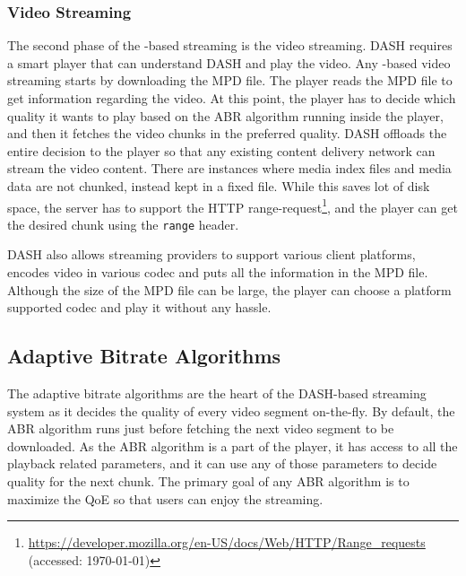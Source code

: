 \subsubsection{Video Streaming}
The second phase of the -based streaming is the video streaming. \ac{DASH} requires a smart player that can understand \ac{DASH} and play the video. Any -based video streaming starts by downloading the \ac{MPD} file. The player reads the \ac{MPD} file to get information regarding the video.  At this point, the player has to decide which quality it wants to play based on the \ac{ABR} algorithm running inside the player, and then it fetches the video chunks in the preferred quality. \ac{DASH} offloads the entire decision to the player so that any existing content delivery network can stream the video content. There are instances where media index files and media data are not chunked, instead kept in a fixed file. While this saves lot of disk space, the server has to support the HTTP range-request\footnote{\url{https://developer.mozilla.org/en-US/docs/Web/HTTP/Range_requests} (accessed: \today)}, and the player can get the desired chunk using the {\tt range} header.

\ac{DASH} also allows streaming providers to support various client platforms, encodes video in various codec and puts all the information in the \ac{MPD} file. Although the size of the \ac{MPD} file can be large, the player can choose a platform supported codec and play it without any hassle.


\subsection{Adaptive Bitrate Algorithms}
The adaptive bitrate algorithms are the heart of the DASH-based streaming system as it decides the quality of every video segment on-the-fly. By default, the \ac{ABR} algorithm runs just before fetching the next video segment to be downloaded. As the \ac{ABR} algorithm is a part of the player, it has access to all the playback related parameters, and it can use any of those parameters to decide quality for the next chunk. The primary goal of any \ac{ABR} algorithm is to maximize the \ac{QoE} so that users can enjoy the streaming.


